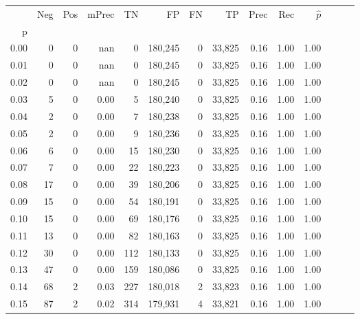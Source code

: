 \begin{tabular}{rrrrrrrrrrrrrr}
\toprule
{} &    Neg &    Pos & mPrec &       TN &       FP &      FN &      TP &  Prec &   Rec & $\hat{p}$ \\
p    &        &        &       &          &          &         &         &       &       &           \\
\midrule
0.00 &      0 &      0 &   nan &        0 &  180,245 &       0 &  33,825 &  0.16 &  1.00 &      1.00 \\
0.01 &      0 &      0 &   nan &        0 &  180,245 &       0 &  33,825 &  0.16 &  1.00 &      1.00 \\
0.02 &      0 &      0 &   nan &        0 &  180,245 &       0 &  33,825 &  0.16 &  1.00 &      1.00 \\
0.03 &      5 &      0 &  0.00 &        5 &  180,240 &       0 &  33,825 &  0.16 &  1.00 &      1.00 \\
0.04 &      2 &      0 &  0.00 &        7 &  180,238 &       0 &  33,825 &  0.16 &  1.00 &      1.00 \\
0.05 &      2 &      0 &  0.00 &        9 &  180,236 &       0 &  33,825 &  0.16 &  1.00 &      1.00 \\
0.06 &      6 &      0 &  0.00 &       15 &  180,230 &       0 &  33,825 &  0.16 &  1.00 &      1.00 \\
0.07 &      7 &      0 &  0.00 &       22 &  180,223 &       0 &  33,825 &  0.16 &  1.00 &      1.00 \\
0.08 &     17 &      0 &  0.00 &       39 &  180,206 &       0 &  33,825 &  0.16 &  1.00 &      1.00 \\
0.09 &     15 &      0 &  0.00 &       54 &  180,191 &       0 &  33,825 &  0.16 &  1.00 &      1.00 \\
0.10 &     15 &      0 &  0.00 &       69 &  180,176 &       0 &  33,825 &  0.16 &  1.00 &      1.00 \\
0.11 &     13 &      0 &  0.00 &       82 &  180,163 &       0 &  33,825 &  0.16 &  1.00 &      1.00 \\
0.12 &     30 &      0 &  0.00 &      112 &  180,133 &       0 &  33,825 &  0.16 &  1.00 &      1.00 \\
0.13 &     47 &      0 &  0.00 &      159 &  180,086 &       0 &  33,825 &  0.16 &  1.00 &      1.00 \\
0.14 &     68 &      2 &  0.03 &      227 &  180,018 &       2 &  33,823 &  0.16 &  1.00 &      1.00 \\
0.15 &     87 &      2 &  0.02 &      314 &  179,931 &       4 &  33,821 &  0.16 &  1.00 &      1.00 \\

\end{tabular}
